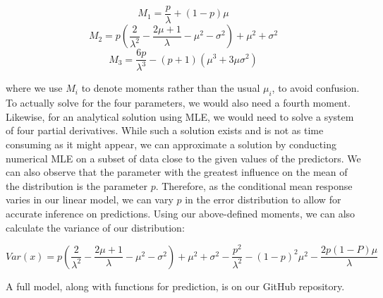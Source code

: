 \documentclass[12pt, a4paper, openany]{book}
\begin{document}
	\begin{center}
	$$M_1 = \frac{p}{\lambda} +(1- p)\mu$$
	$$M_2 = p\left(\frac{2}{\lambda^2} - \frac{2\mu+1}{\lambda} - \mu^2 - \sigma^2\right) +\mu^2 +\sigma^2$$
	$$M_3 = \frac{6p}{\lambda^3} -(p+1)(\mu^3 + 3\mu\sigma^2) $$
	\end{center} 
	where we use $M_i$ to denote moments rather than the usual $\mu_i$, to avoid confusion. To actually solve for the four parameters, we would also need a fourth moment. Likewise, for an analytical solution using MLE, we would need to solve a system of four partial derivatives. While such a solution exists and is not as time consuming as it might appear, we can approximate a solution by conducting numerical MLE on a subset of data close to the given values of the predictors. We can also observe that the parameter with the greatest influence on the mean of the distribution is the parameter $p$. Therefore, as the conditional mean response varies in our linear model, we can vary $p$ in the error distribution to allow for accurate inference on predictions. Using our above-defined moments, we can also calculate the variance of our distribution:
\begin{center}
$$Var(x) = p\left(\frac{2}{\lambda^2} - \frac{2\mu+1}{\lambda} -\mu^2 -\sigma^2\right) +\mu^2 + \sigma^2 - \frac{p^2}{\lambda^2} - (1-p)^2\mu^2 - \frac{2p(1-P)\mu}{\lambda}$$
\end{center}

A full model, along with functions for prediction, is on our GitHub repository. 
\end{document}
